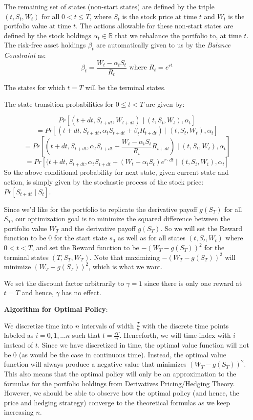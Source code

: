 \documentclass[12pt]{exam}
\begin{document}
\begin{questions}
The remaining set of states (non-start states) are defined by the triple $(t, S_t, W_t)$ for all $0 < t \leq T$, where $S_t$ is the stock price at time $t$ and $W_t$ is the portfolio value at time $t$. The actions allowable for these non-start states are defined by the stock holdings $\alpha_t \in \mathbb{R}$ that we rebalance the portfolio to, at time $t$. The risk-free asset holdings $\beta_t$ are automatically given to us by the {\em Balance Constraint} as:
$$\beta_t = \frac {W_t - \alpha_t S_t} {R_t} \mbox{ where } R_t = e^{rt}$$

The states for which $t=T$ will be the terminal states.

The state transition probabilities for $0 \leq t < T$ are given by:

$$Pr[(t+dt, S_{t+dt}, W_{t+dt}) \mid (t, S_t, W_t), \alpha_t]$$
$$ = Pr[(t+dt, S_{t+dt}, \alpha_t S_{t+dt} + \beta_t R_{t+dt}) \mid (t, S_t, W_t), \alpha_t] $$
$$ = Pr[(t+dt, S_{t+dt}, \alpha_t S_{t+dt} + \frac {W_t - \alpha_t S_t} {R_t} R_{t+dt}) \mid (t, S_t, W_t), \alpha_t] $$
$$= Pr[(t+dt, S_{t+dt}, \alpha_t S_{t+dt} + (W_t - \alpha_t S_t) e^{r \cdot dt} \mid (t, S_t, W_t), \alpha_t] $$
So the above conditional probability for next state, given current state and action, is simply given by the stochastic process
of the stock price: $Pr[S_{t+dt} \mid S_t]$.

Since we'd like for the portfolio to replicate the derivative payoff $g(S_T)$ for all $S_T$, our optimization goal is to minimize the squared difference between the portfolio value $W_T$ and the derivative payoff $g(S_T)$. So we will set the Reward function to be 0 for the start state $s_0$ as well as for all states $(t, S_t, W_t)$ where $0 < t < T$, and set the Reward function to be $-(W_T - g(S_T))^2$ for the terminal states $(T, S_T, W_T)$. Note that maximizing $-(W_T - g(S_T))^2$ will minimize $(W_T - g(S_T))^2$, which is what we want.

We set the discount factor arbitrarily to $\gamma = 1$ since there is only one reward at $t=T$ and hence, $\gamma$ has no effect.

{\bf Algorithm for Optimal Policy}:

 We discretize time into $n$ intervals of width $\frac T n$ with the discrete time points labeled as $i = 0, 1, \ldots n$ such that $t = \frac {iT} n$. Henceforth, we will time-index with $i$ instead of $t$. Since we have discretized in time, the optimal value function will not be 0 (as would be the case in continuous time). Instead, the optimal value function will always produce a negative value that minimizes $(W_T - g(S_T))^2$. This also means that the optimal policy will only be an approximation to the formulas for the portfolio holdings from Derivatives Pricing/Hedging Theory. However, we should be able to observe how the optimal policy (and hence, the price and hedging strategy) converge to the theoretical formulas as we keep increasing $n$.


\end{questions}
\end{document}
